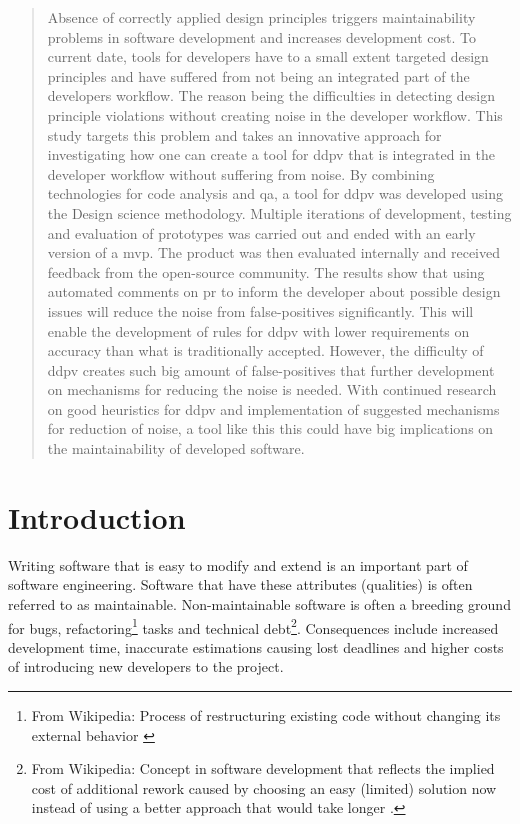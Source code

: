 \documentclass[pdftex,10pt,b5paper,twoside]{report}
\begin{document}
\begin{abstract}
	Absence of correctly applied design principles triggers maintainability problems in software development and increases development cost. To current date, tools for developers have to a small extent targeted design principles and have suffered from not being an integrated part of the developers workflow. The reason being the difficulties in detecting design principle violations without creating noise in the developer workflow. This study targets this problem and takes an innovative approach for investigating how one can create a tool for \gls{ddpv} that is integrated in the developer workflow without suffering from noise. By combining technologies for code analysis and \gls{qa}, a tool for \gls{ddpv} was developed using the Design science methodology. Multiple iterations of development, testing and evaluation of prototypes was carried out and ended with an early version of a \acrfull{mvp}. The product was then evaluated internally and received feedback from the open-source community. The results show that using automated comments on \gls{pr} to inform the developer about possible design issues will reduce the noise from false-positives significantly. This will enable the development of rules for \gls{ddpv} with lower requirements on accuracy than what is traditionally accepted. However, the difficulty of \gls{ddpv} creates such big amount of false-positives that further development on mechanisms for reducing the noise is needed. With continued research on good heuristics for \gls{ddpv} and implementation of suggested mechanisms for reduction of noise, a tool like this this could have big implications on the maintainability of developed software. 
	
\end{abstract}
\clearpage



\tableofcontents

\cleardoublepage
\chapter{Introduction}




Writing software that is easy to modify and extend is an important part of software engineering. Software that have these attributes (qualities) is often referred to as maintainable. Non-maintainable software is often a breeding ground for bugs, refactoring\footnote{From Wikipedia: Process of restructuring existing code without changing its external behavior \cite{refactoring}} tasks and technical debt\footnote{From Wikipedia: Concept in software development that reflects the implied cost of additional rework caused by choosing an easy (limited) solution now instead of using a better approach that would take longer \cite{technicalDebt}.}. Consequences include increased development time, inaccurate estimations causing lost deadlines and higher costs of introducing new developers to the project.
\end{document}
